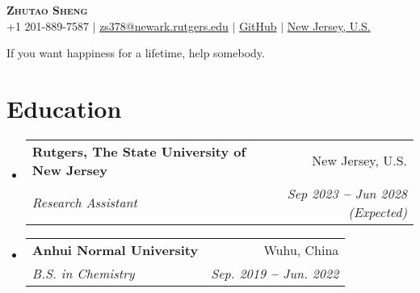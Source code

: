 \documentclass[letterpaper,11pt]{article}
\makeatletter
\newcommand{\resumeSubheading}[4]{
	\vspace{-2pt}\item
	\begin{tabular*}{0.97\textwidth}[t]{l@{\extracolsep{\fill}}r}
		\textbf{#1} & #2 \\
		\textit{\small#3} & \textit{\small #4} \\
	\end{tabular*}\vspace{-7pt}
}
\newcommand{\resumeSubHeadingListStart}{\begin{itemize}[leftmargin=0.15in, label={}]}
\newcommand{\resumeSubHeadingListEnd}{\end{itemize}}
\makeatother
\begin{document}
	
	
	\begin{center}
		\textbf{\Huge \scshape Zhutao Sheng} \\ \vspace{3pt}
		\small
		\faMobile \hspace{.5pt} {+1 201-889-7587}
		$|$
		\faAt \hspace{.5pt} \href{mailto:arasgungore09@gmail.com}{zs378@newark.rutgers.edu}
		$|$
		\faGithub \hspace{.5pt} \href{https://github.com/zhutaosheng}{GitHub}
		$|$
		\faMapMarker \hspace{.5pt} \href{https://www.google.com/maps/place/Olson+Hall+-+Chemistry/@40.7409235,-74.1751715,17.38z/data=!4m6!3m5!1s0x89c2537e60739387:0xcc3cf6ac4fa15af4!8m2!3d40.7401976!4d-74.1753061!16s%2Fg%2F11fy965_6r}{New Jersey, U.S.}
	\end{center}
	
	\begin{center}
		If you want happiness for a lifetime, help somebody.
	\end{center}
	
	
	\section{Education}
	\vspace{3pt}
	\resumeSubHeadingListStart
	
	\resumeSubheading
	{Rutgers, The State University of New Jersey}{New Jersey, U.S.}
	{Research Assistant}{Sep 2023 \textbf{--} Jun 2028 (Expected)}
	
	
	\resumeSubheading
	{Anhui Normal University }{Wuhu, China}
	{B.S. in Chemistry}{Sep. 2019 \textbf{--} Jun. 2022}
	
	\resumeSubHeadingListEnd
	
	
	
	
	
\end{document}
